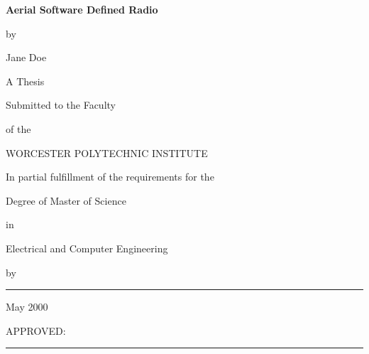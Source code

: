 \documentclass[12pt]{report}
\begin{document}
	
	
	
	\newcommand{\brk}{\vspace*{0.18in}}
	
	\thispagestyle{empty}
	
	\begin{center}
		
		\brk
		
		
		{\large 
			\textbf{
				Aerial Software Defined Radio
			}
		}
		
		
		\brk
		by
		
		\brk
		Jane Doe
		
		
		\brk\brk
		A Thesis
		
		\brk
		Submitted to the Faculty
		
		\brk
		of the 
		
		\brk
		WORCESTER POLYTECHNIC INSTITUTE
		
		\brk
		In partial fulfillment of the requirements for the
		
		\brk
		Degree of Master of Science
		
		\brk
		in
		
		\brk
		Electrical and Computer Engineering
		
		\brk
		by
		
		\brk\brk
		\rule{3in}{1.2pt}
		
		\brk
		May 2000
		
	\end{center}
	
	
	\vfill
	APPROVED:
	
	\vspace{0.5in}
	\rule{3in}{0.8pt}
	
\end{document}

